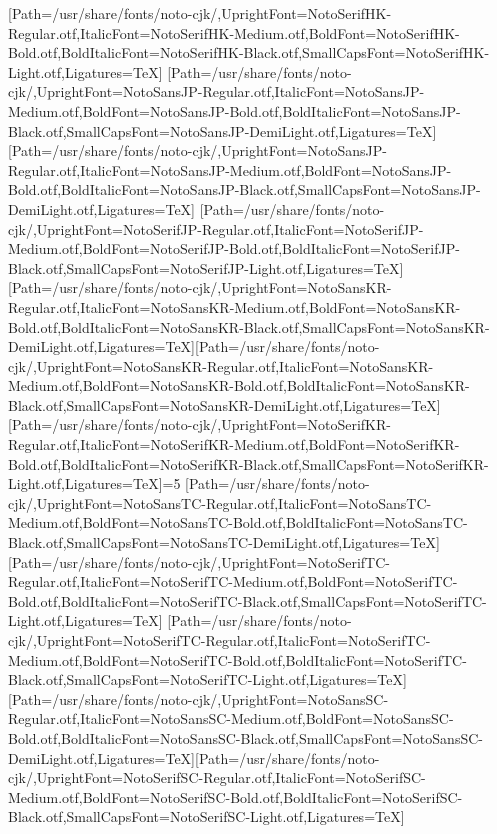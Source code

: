 \newfontfamily{}[Path=/usr/share/fonts/noto-cjk/,UprightFont=NotoSerifHK-Regular.otf,ItalicFont=NotoSerifHK-Medium.otf,BoldFont=NotoSerifHK-Bold.otf,BoldItalicFont=NotoSerifHK-Black.otf,SmallCapsFont=NotoSerifHK-Light.otf,Ligatures=TeX]
\newfontfamily{}[Path=/usr/share/fonts/noto-cjk/,UprightFont=NotoSansJP-Regular.otf,ItalicFont=NotoSansJP-Medium.otf,BoldFont=NotoSansJP-Bold.otf,BoldItalicFont=NotoSansJP-Black.otf,SmallCapsFont=NotoSansJP-DemiLight.otf,Ligatures=TeX]\newfontfamily{}[Path=/usr/share/fonts/noto-cjk/,UprightFont=NotoSansJP-Regular.otf,ItalicFont=NotoSansJP-Medium.otf,BoldFont=NotoSansJP-Bold.otf,BoldItalicFont=NotoSansJP-Black.otf,SmallCapsFont=NotoSansJP-DemiLight.otf,Ligatures=TeX]
\newfontfamily{}[Path=/usr/share/fonts/noto-cjk/,UprightFont=NotoSerifJP-Regular.otf,ItalicFont=NotoSerifJP-Medium.otf,BoldFont=NotoSerifJP-Bold.otf,BoldItalicFont=NotoSerifJP-Black.otf,SmallCapsFont=NotoSerifJP-Light.otf,Ligatures=TeX]
\newfontfamily{}[Path=/usr/share/fonts/noto-cjk/,UprightFont=NotoSansKR-Regular.otf,ItalicFont=NotoSansKR-Medium.otf,BoldFont=NotoSansKR-Bold.otf,BoldItalicFont=NotoSansKR-Black.otf,SmallCapsFont=NotoSansKR-DemiLight.otf,Ligatures=TeX]\newfontfamily{}[Path=/usr/share/fonts/noto-cjk/,UprightFont=NotoSansKR-Regular.otf,ItalicFont=NotoSansKR-Medium.otf,BoldFont=NotoSansKR-Bold.otf,BoldItalicFont=NotoSansKR-Black.otf,SmallCapsFont=NotoSansKR-DemiLight.otf,Ligatures=TeX]
\newfontfamily{}[Path=/usr/share/fonts/noto-cjk/,UprightFont=NotoSerifKR-Regular.otf,ItalicFont=NotoSerifKR-Medium.otf,BoldFont=NotoSerifKR-Bold.otf,BoldItalicFont=NotoSerifKR-Black.otf,SmallCapsFont=NotoSerifKR-Light.otf,Ligatures=TeX]\else\ifnum\value{NotoCJKFamily}=5
\newfontfamily{}[Path=/usr/share/fonts/noto-cjk/,UprightFont=NotoSansTC-Regular.otf,ItalicFont=NotoSansTC-Medium.otf,BoldFont=NotoSansTC-Bold.otf,BoldItalicFont=NotoSansTC-Black.otf,SmallCapsFont=NotoSansTC-DemiLight.otf,Ligatures=TeX]\newfontfamily{}[Path=/usr/share/fonts/noto-cjk/,UprightFont=NotoSerifTC-Regular.otf,ItalicFont=NotoSerifTC-Medium.otf,BoldFont=NotoSerifTC-Bold.otf,BoldItalicFont=NotoSerifTC-Black.otf,SmallCapsFont=NotoSerifTC-Light.otf,Ligatures=TeX]
\newfontfamily{}[Path=/usr/share/fonts/noto-cjk/,UprightFont=NotoSerifTC-Regular.otf,ItalicFont=NotoSerifTC-Medium.otf,BoldFont=NotoSerifTC-Bold.otf,BoldItalicFont=NotoSerifTC-Black.otf,SmallCapsFont=NotoSerifTC-Light.otf,Ligatures=TeX]
\newfontfamily{}[Path=/usr/share/fonts/noto-cjk/,UprightFont=NotoSansSC-Regular.otf,ItalicFont=NotoSansSC-Medium.otf,BoldFont=NotoSansSC-Bold.otf,BoldItalicFont=NotoSansSC-Black.otf,SmallCapsFont=NotoSansSC-DemiLight.otf,Ligatures=TeX]\newfontfamily{}[Path=/usr/share/fonts/noto-cjk/,UprightFont=NotoSerifSC-Regular.otf,ItalicFont=NotoSerifSC-Medium.otf,BoldFont=NotoSerifSC-Bold.otf,BoldItalicFont=NotoSerifSC-Black.otf,SmallCapsFont=NotoSerifSC-Light.otf,Ligatures=TeX]
